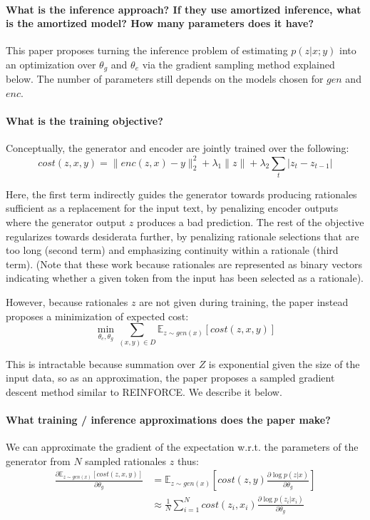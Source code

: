 \documentclass[11pt]{article}
\begin{document}
\paragraph{What is the inference approach? If they use amortized inference, what is the amortized model? How many parameters does it have?} This paper proposes turning the inference problem of estimating $p(z|x;y)$ into an optimization over $\theta_g$ and $\theta_e$ via the gradient sampling method explained below. The number of parameters still depends on the models chosen for $gen$ and $enc$.

\paragraph{What is the training objective?} Conceptually, the generator and encoder are jointly trained over the following:
$$cost(z,x,y) = \|enc(z,x) - y \|_2^2 + \lambda_1\|z\| + \lambda_2\sum_t |z_t - z_{t-1}|$$

Here, the first term indirectly guides the generator towards producing rationales sufficient as a replacement for the input text, by penalizing encoder outputs where the generator output $z$ produces a bad prediction. The rest of the objective regularizes towards desiderata further, by penalizing rationale selections that are too long (second term) and emphasizing continuity within a rationale (third term). (Note that these work because rationales are represented as binary vectors indicating whether a given token from the input has been selected as a rationale).

However, because rationales $z$ are not given during training, the paper instead proposes a minimization of expected cost:
$$\min_{\theta_e,\theta_g}\sum_{(x,y)\in D} \mathbb{E}_{z\sim gen(x)} [cost(z,x,y)] $$

This is intractable because summation over $Z$ is exponential given the size of the input data, so as an approximation, the paper proposes a sampled gradient descent method similar to REINFORCE. We describe it below.

\paragraph{What training / inference approximations does the paper make?} We can approximate the gradient of the expectation w.r.t. the parameters of the generator from $N$ sampled rationales $z$ thus:
\begin{align*}
  \frac{\partial \mathbb{E}_{z\sim gen(x)} [cost(z,x,y)]}{\partial \theta_g} &= \mathbb{E}_{z\sim gen(x)} [cost(z,y) \frac{\partial \log p(z|x)}{\partial \theta_g}] \\
  &\approx \frac{1}{N} \sum_{i=1}^{N} cost(z_i,x_i) \frac{\partial \log p(z_i|x_i)}{\partial \theta_g}
\end{align*}
\end{document}
